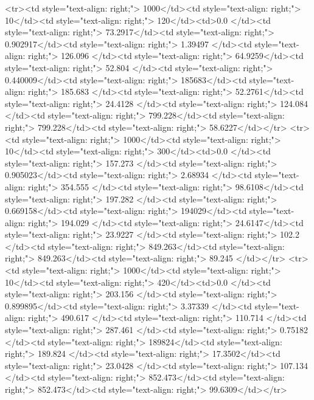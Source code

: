 <tr><td style="text-align: right;">      1000</td><td style="text-align: right;">        10</td><td style="text-align: right;">           120</td><td>0.0          </td><td style="text-align: right;">                73.2917</td><td style="text-align: right;">           0.902917</td><td style="text-align: right;">         1.39497 </td><td style="text-align: right;">        126.096 </td><td style="text-align: right;">            64.9259</td><td style="text-align: right;">              52.804   </td><td style="text-align: right;">             0.440009</td><td style="text-align: right;">              185683</td><td style="text-align: right;">                      185.683 </td><td style="text-align: right;">            52.2761</td><td style="text-align: right;">                24.4128 </td><td style="text-align: right;">       124.084 </td><td style="text-align: right;">    799.228</td><td style="text-align: right;">       799.228</td><td style="text-align: right;">                 58.6227</td></tr>
<tr><td style="text-align: right;">      1000</td><td style="text-align: right;">        10</td><td style="text-align: right;">           300</td><td>0.0          </td><td style="text-align: right;">               157.273 </td><td style="text-align: right;">           0.905023</td><td style="text-align: right;">         2.68934 </td><td style="text-align: right;">        354.555 </td><td style="text-align: right;">            98.6108</td><td style="text-align: right;">             197.282   </td><td style="text-align: right;">             0.669158</td><td style="text-align: right;">              194029</td><td style="text-align: right;">                      194.029 </td><td style="text-align: right;">            24.6147</td><td style="text-align: right;">                23.9227 </td><td style="text-align: right;">       102.2   </td><td style="text-align: right;">    849.263</td><td style="text-align: right;">       849.263</td><td style="text-align: right;">                 89.245 </td></tr>
<tr><td style="text-align: right;">      1000</td><td style="text-align: right;">        10</td><td style="text-align: right;">           420</td><td>0.0          </td><td style="text-align: right;">               203.156 </td><td style="text-align: right;">           0.899895</td><td style="text-align: right;">         3.37339 </td><td style="text-align: right;">        490.617 </td><td style="text-align: right;">           110.714 </td><td style="text-align: right;">             287.461   </td><td style="text-align: right;">             0.75182 </td><td style="text-align: right;">              189824</td><td style="text-align: right;">                      189.824 </td><td style="text-align: right;">            17.3502</td><td style="text-align: right;">                23.0428 </td><td style="text-align: right;">       107.134 </td><td style="text-align: right;">    852.473</td><td style="text-align: right;">       852.473</td><td style="text-align: right;">                 99.6309</td></tr>
